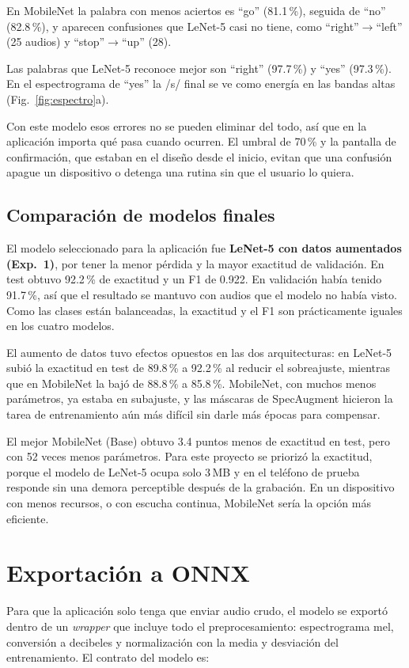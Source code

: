 \documentclass[conference]{IEEEtran}
\begin{document}
En MobileNet la palabra con menos aciertos es ``go'' (81.1\,\%), seguida de ``no'' (82.8\,\%), y aparecen confusiones que LeNet-5 casi no tiene, como ``right''$\rightarrow$``left'' (25 audios) y ``stop''$\rightarrow$``up'' (28).

Las palabras que LeNet-5 reconoce mejor son ``right'' (97.7\,\%) y ``yes'' (97.3\,\%). En el espectrograma de ``yes'' la /s/ final se ve como energía en las bandas altas (Fig.~\ref{fig:espectro}a).

Con este modelo esos errores no se pueden eliminar del todo, así que en la aplicación importa qué pasa cuando ocurren. El umbral de 70\,\% y la pantalla de confirmación, que estaban en el diseño desde el inicio, evitan que una confusión apague un dispositivo o detenga una rutina sin que el usuario lo quiera.

\subsection{Comparación de modelos finales}
El modelo seleccionado para la aplicación fue \textbf{LeNet-5 con datos aumentados (Exp.~1)}, por tener la menor pérdida y la mayor exactitud de validación. En test obtuvo 92.2\,\% de exactitud y un F1 de 0.922. En validación había tenido 91.7\,\%, así que el resultado se mantuvo con audios que el modelo no había visto. Como las clases están balanceadas, la exactitud y el F1 son prácticamente iguales en los cuatro modelos.

El aumento de datos tuvo efectos opuestos en las dos arquitecturas: en LeNet-5 subió la exactitud en test de 89.8\,\% a 92.2\,\% al reducir el sobreajuste, mientras que en MobileNet la bajó de 88.8\,\% a 85.8\,\%. MobileNet, con muchos menos parámetros, ya estaba en subajuste, y las máscaras de SpecAugment hicieron la tarea de entrenamiento aún más difícil sin darle más épocas para compensar.

El mejor MobileNet (Base) obtuvo 3.4 puntos menos de exactitud en test, pero con 52 veces menos parámetros. Para este proyecto se priorizó la exactitud, porque el modelo de LeNet-5 ocupa solo 3\,MB y en el teléfono de prueba responde sin una demora perceptible después de la grabación. En un dispositivo con menos recursos, o con escucha continua, MobileNet sería la opción más eficiente.

\section{Exportación a ONNX}
Para que la aplicación solo tenga que enviar audio crudo, el modelo se exportó dentro de un \textit{wrapper} que incluye todo el preprocesamiento: espectrograma mel, conversión a decibeles y normalización con la media y desviación del entrenamiento. El contrato del modelo es:
\end{document}
